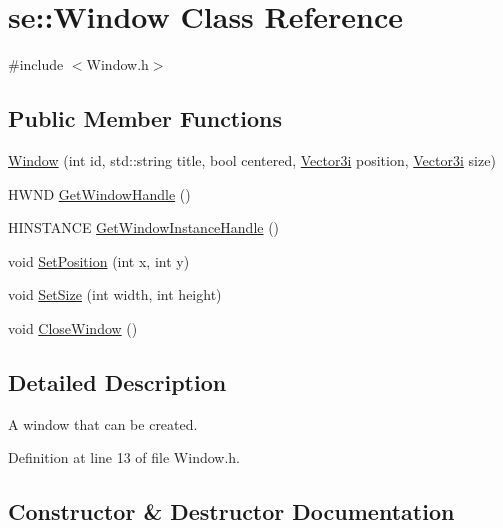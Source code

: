 \hypertarget{classse_1_1_window}{}\section{se\+:\+:Window Class Reference}
\label{classse_1_1_window}


{\ttfamily \#include $<$Window.\+h$>$}

\subsection*{Public Member Functions}
\begin{DoxyCompactItemize}
\item 
\mbox{\hyperlink{classse_1_1_window_afbc248dc17b6a2b3f51f2a4381d2a463}{Window}} (int id, std\+::string title, bool centered, \mbox{\hyperlink{namespacese_ada11715de7cf6e87b5dfb4611fe68d29}{Vector3i}} position, \mbox{\hyperlink{namespacese_ada11715de7cf6e87b5dfb4611fe68d29}{Vector3i}} size)
\item 
H\+W\+ND \mbox{\hyperlink{classse_1_1_window_afa8b06b9831c41d9a38e375bfb133c9e}{Get\+Window\+Handle}} ()
\item 
H\+I\+N\+S\+T\+A\+N\+CE \mbox{\hyperlink{classse_1_1_window_a7ae4b774d8f47d6abb0462e2240e8cae}{Get\+Window\+Instance\+Handle}} ()
\item 
void \mbox{\hyperlink{classse_1_1_window_ad2fc9ceb2c543762bbc863fe6df637a1}{Set\+Position}} (int x, int y)
\item 
void \mbox{\hyperlink{classse_1_1_window_a7c66652dccf4764cfa6e4af6fab684b8}{Set\+Size}} (int width, int height)
\item 
void \mbox{\hyperlink{classse_1_1_window_a5d405fd0707124c8df9d4a628d7a33c7}{Close\+Window}} ()
\end{DoxyCompactItemize}


\subsection{Detailed Description}
A window that can be created. 

Definition at line 13 of file Window.\+h.



\subsection{Constructor \& Destructor Documentation}
\mbox{\label{classse_1_1_window_afbc248dc17b6a2b3f51f2a4381d2a463}} 
